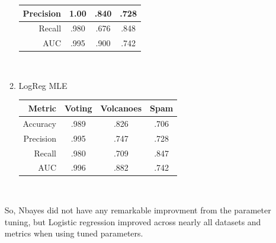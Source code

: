 \documentclass[12pt]{article}
\begin{document}
\begin{enumerate}
\begin{enumerate}
\begin{tabular}{|r|c|c|c|}
                Precision & 1.00 & .840 & .728 \\ \hline
                Recall & .980 & .676 & .848 \\ \hline
                AUC & .995 & .900 & .742 \\ \hline
            \end{tabular}\\
            \item LogReg MLE\\
            \begin{tabular}{|r|c|c|c|}
                \hline
                Metric & Voting & Volcanoes & Spam\\ \hline
                Accuracy & .989 & .826 & .706 \\ \hline
                Precision & .995 & .747 & .728 \\ \hline
                Recall & .980 & .709 & .847 \\ \hline
                AUC & .996 & .882 & .742 \\ \hline
            \end{tabular}\\
        \end{enumerate}

        So, Nbayes did not have any remarkable improvment from the parameter
        tuning, but Logistic regression improved across nearly all datasets
        and metrics when using tuned parameters.
\end{enumerate}
\end{document}
